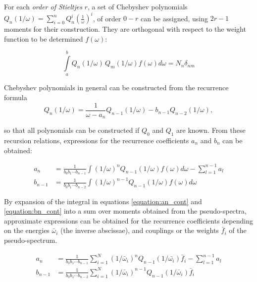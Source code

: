 For each \emph{order of Stieltjes} $r$, a set of
Chebyshev polynomials
$Q_n (1/\omega) = \sum\limits_{i=0}^n Q_n^{i}\left( \frac{1}{\omega} \right)^{i}$,
of order $0-r$ can be assigned, using $2r-1$ moments for their construction.
They are orthogonal with respect to the weight function
to be determined $f(\omega)$:

\begin{equation}
  \int\limits_a^b Q_n(1/\omega) \, Q_m(1/\omega) f(\omega) d\omega = N_n \delta_{nm}
\end{equation}

Chebyshev polynomials in general can be constructed from the recurrence formula
\begin{equation}
 Q_n(1/\omega) = \frac{1}{\omega - a_n} Q_{n-1}(1/\omega) - b_{n-1} Q_{n-2}(1/\omega),
\end{equation}

so that all polynomials can be constructed if $Q_0$ and $Q_1$ are known.
From these recursion relations, expressions for the recurrence coefficients
$a_n$ and $b_n$ can be obtained:

\begin{align}
  a_n     &= \frac{1}{b_0b_1\cdots b_{n-1}}
             \int (1/\omega)^n Q_{n-1}(1/\omega) f(\omega) d\omega
             - \sum\limits_{l=1}^{n-1} a_l  \label{equation:an_cont}\\
  b_{n-1} &= \frac{1}{b_0b_1\cdots b_{n-2}}
             \int (1/\omega)^{n-1} Q_{n-1}(1/\omega) f(\omega) d\omega \label{equation:bn_cont}
\end{align}

By expansion of the integral in equations \ref{equation:an_cont} and
\ref{equation:bn_cont} into a sum over moments obtained from the pseudo-spectra,
approximate expressions can be obtained for the recurrence coefficients
depending on the energies $\bar{\omega}_i$ (the inverse abscissae),
and couplings or the weights $\bar{f}_i$ of the
pseudo-spectrum.

\begin{align}
  a_n     &= \frac{1}{b_0b_1\cdots b_{n-1}}
             \sum\limits_{i=1}^N
               (1/\bar{\omega}_i)^n Q_{n-1}(1/\bar{\omega_i}) \bar{f}_i
             - \sum\limits_{l=1}^{n-1} a_l \label{equation:an_disc}\\
  b_{n-1} &= \frac{1}{b_0b_1\cdots b_{n-2}}
             \sum\limits_{i=1}^N
               (1/\bar{\omega}_i)^{n-1} Q_{n-1}(1/\bar{\omega}_i) \bar{f}_i
\end{align}

